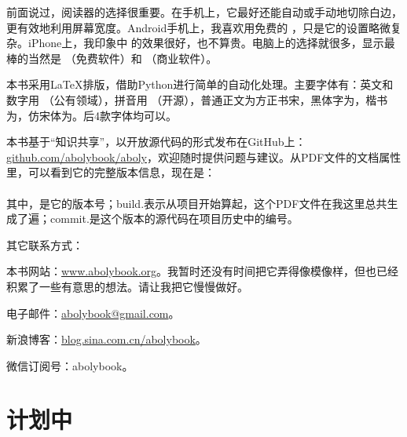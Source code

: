 前面说过，阅读器的选择很重要。在手机上，它最好还能自动或手动地切除白边，更有效地利用屏幕宽度。Android手机上，我喜欢用免费的 ，只是它的设置略微复杂。iPhone上，我印象中  的效果很好，也不算贵。电脑上的选择就很多，显示最棒的当然是 （免费软件）和 （商业软件）。

本书采用LaTeX排版，借助Python进行简单的自动化处理。主要字体有：英文和数字用 （公有领域），拼音用 （开源），普通正文为方正书宋，黑体字为，楷书为，仿宋体为。后4款字体均可以。

本书基于“知识共享”，以开放源代码的形式发布在GitHub上：\href{https://github.com/abolybook/aboly}{github.com/abolybook/aboly}，欢迎随时提供问题与建议。从PDF文件的文档属性里，可以看到它的完整版本信息，现在是：\\
\versioninfoaboly\\
其中，\projectversionnumber 是它的版本号；build.\buildnoaboly 表示从项目开始算起，这个PDF文件在我这里总共生成了\buildnoaboly 遍；commit.\lycommitno 是这个版本的源代码在项目历史中的编号。

其它联系方式：
\begin{lyitemize}
\item 本书网站：\href{http://www.abolybook.org/}{www.abolybook.org}。我暂时还没有时间把它弄得像模像样，但也已经积累了一些有意思的想法。请让我把它慢慢做好。
\item 电子邮件：\href{mailto:abolybook@gmail.com}{abolybook@gmail.com}。
\item 新浪博客：\href{http://blog.sina.com.cn/abolybook}{blog.sina.com.cn/abolybook}。
\item 微信订阅号：abolybook。
\end{lyitemize}


\lypdfbookmark\section*{计划中}

